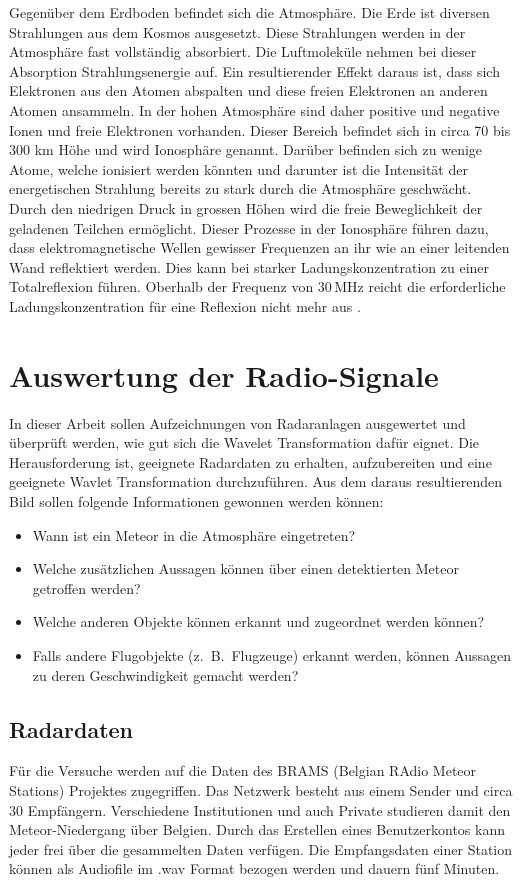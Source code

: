 \begin{refsection}
Gegenüber dem Erdboden befindet sich die Atmosphäre.
Die Erde ist diversen Strahlungen aus dem Kosmos ausgesetzt.
Diese Strahlungen werden in der Atmosphäre fast vollständig absorbiert.
Die Luftmoleküle nehmen bei dieser Absorption Strahlungsenergie auf.
Ein resultierender Effekt daraus ist, dass sich Elektronen aus den Atomen abspalten und diese freien Elektronen an anderen Atomen ansammeln.
In der hohen Atmosphäre sind daher positive und negative Ionen und freie Elektronen vorhanden.
Dieser Bereich befindet sich in circa 70 bis 300 km Höhe und wird Ionosphäre genannt.
%
Darüber befinden sich zu wenige Atome, welche ionisiert werden könnten und darunter ist die Intensität der energetischen Strahlung bereits zu stark durch die Atmosphäre geschwächt.
Durch den niedrigen Druck in grossen Höhen wird die freie Beweglichkeit der geladenen Teilchen ermöglicht.
Dieser Prozesse in der Ionosphäre führen dazu, dass elektromagnetische Wellen gewisser Frequenzen an ihr wie an einer leitenden Wand reflektiert werden.
Dies kann bei starker Ladungskonzentration zu einer Totalreflexion führen. 
Oberhalb der Frequenz von 30\,MHz reicht die erforderliche Ladungskonzentration für eine Reflexion nicht mehr aus \cite{buch:meinke}.


\section{Auswertung der Radio-Signale}

In dieser Arbeit sollen Aufzeichnungen von Radaranlagen ausgewertet und überprüft werden, wie gut sich die Wavelet Transformation dafür eignet.
Die Herausforderung ist, geeignete Radardaten zu erhalten, aufzubereiten und eine geeignete Wavlet Transformation durchzuführen.
Aus dem daraus resultierenden Bild sollen folgende Informationen gewonnen werden können:
\begin{itemize}
	\item Wann ist ein Meteor in die Atmosphäre eingetreten?
	\item Welche zusätzlichen Aussagen können über einen detektierten Meteor getroffen werden?
	\item Welche anderen Objekte können erkannt und zugeordnet werden können?
	\item Falls andere Flugobjekte (z.~B.~Flugzeuge) erkannt werden, können Aussagen zu deren Geschwindigkeit gemacht werden?
\end{itemize}

\subsection{Radardaten}
Für die Versuche werden auf die Daten des BRAMS (Belgian RAdio Meteor Stations) Projektes zugegriffen.
%
%
Das Netzwerk besteht aus einem Sender und circa 30 Empfängern.
Verschiedene Institutionen und auch Private studieren damit den Meteor-Niedergang über Belgien.
Durch das Erstellen eines Benutzerkontos kann jeder frei über die gesammelten Daten verfügen.
Die Empfangsdaten einer Station können als Audiofile im .wav Format bezogen werden und dauern fünf Minuten.


\end{refsection}
